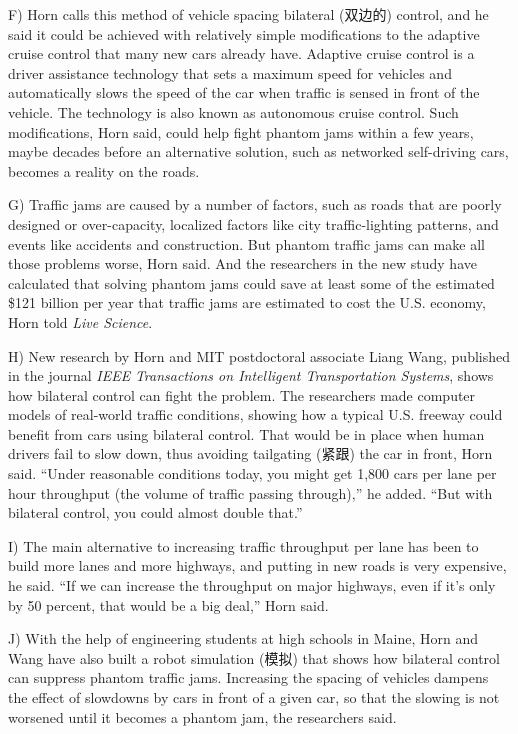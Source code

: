 \documentclass[UTF8,11pt]{ctexart}
\begin{document}
F) Horn calls this method of vehicle spacing bilateral (双边的) control, and he said it could be achieved with relatively simple modifications to the adaptive cruise control that many new cars already have. Adaptive cruise control is a driver assistance technology that sets a maximum speed for vehicles and automatically slows the speed of the car when traffic is sensed in front of the vehicle. The technology is also known as autonomous cruise control. Such modifications, Horn said, could help fight phantom jams within a few years, maybe decades before an alternative solution, such as networked self-driving cars, becomes a reality on the roads.


G) Traffic jams are caused by a number of factors, such as roads that are poorly designed or over-capacity, localized factors like city traffic-lighting patterns, and events like accidents and construction. But phantom traffic jams can make all those problems worse, Horn said. And the researchers in the new study have calculated that solving phantom jams could save at least some of the estimated \$121 billion per year that traffic jams are estimated to cost the U.S. economy, Horn told \textit{Live Science}.


H) New research by Horn and MIT postdoctoral associate Liang Wang, published in the journal \textit{IEEE} \textit{Transactions on Intelligent Transportation Systems}, shows how bilateral control can fight the problem. The researchers made computer models of real-world traffic conditions, showing how a typical U.S. freeway could benefit from cars using bilateral control. That would be in place when human drivers fail to slow down, thus avoiding tailgating (紧跟) the car in front, Horn said. “Under reasonable conditions today, you might get 1,800 cars per lane per hour throughput (the volume of traffic passing through),” he added. “But with bilateral control, you could almost double that.”


I) The main alternative to increasing traffic throughput per lane has been to build more lanes and more highways, and putting in new roads is very expensive, he said. “If we can increase the throughput on major highways, even if it’s only by 50 percent, that would be a big deal,” Horn said.


J) With the help of engineering students at high schools in Maine, Horn and Wang have also built a robot simulation (模拟) that shows how bilateral control can suppress phantom traffic jams. Increasing the spacing of vehicles dampens the effect of slowdowns by cars in front of a given car, so that the slowing is not worsened until it becomes a phantom jam, the researchers said.
\end{document}
